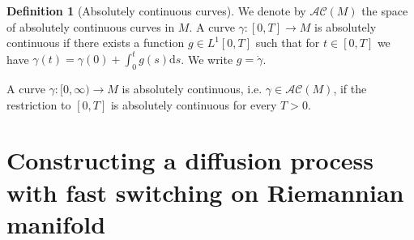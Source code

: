 \documentclass[a4paper]{article}
\numberwithin{equation}{section}
\theoremstyle{definition}
\newtheorem{definition}[theorem]{Definition}
\begin{document}
\begin{definition}[Absolutely continuous curves]
	We denote by $\mathcal{AC}(M)$ the space of absolutely continuous curves in $M$. 
	A curve $\gamma:[0,T]\to M$ is absolutely continuous if there exists a function $g\in L^1[0,T]$ such that for $t\in[0,T]$ we have $\gamma(t)=\gamma(0)+\int^t_0g(s)\text{d}s$. We write $g=\dot{\gamma}$.
	
	A curve $\gamma:[0,\infty)\to M$ is absolutely continuous, i.e. $\gamma\in \mathcal{AC}(M)$, if the restriction to $[0,T]$ is absolutely continuous for every $T>0$.
\end{definition}

\section{Constructing a diffusion process with fast switching on Riemannian manifold}\label{sec_establishing_diffusion}
\end{document}
